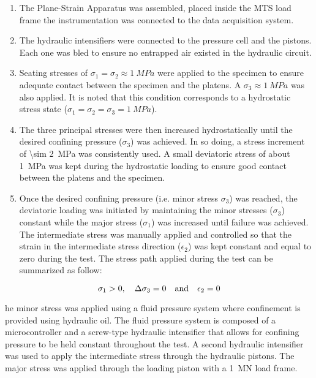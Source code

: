 \begin{enumerate}
    \item The Plane-Strain Apparatus was assembled, placed inside the MTS load frame the instrumentation was connected to the data acquisition system.
    \item The hydraulic intensifiers were connected to the pressure cell and the pistons. Each one was bled to ensure no entrapped air existed in the hydraulic circuit. 
    \item Seating stresses of $\sigma_1 = \sigma_2 \approx \SI{1}{MPa}$ were applied to the specimen to ensure adequate contact between the specimen and the platens. A $\sigma_3 \approx \SI{1}{MPa}$ was also applied. It is noted that this condition corresponds to a hydrostatic stress state ($\sigma_1 = \sigma_2 = \sigma_3 = \SI{1}{MPa}$).
    \item The three principal stresses were then increased hydrostatically until the desired confining pressure ($\sigma_3$) was achieved. In so doing, a stress increment of \SI{\sim 2}{MPa} was consistently used. A small deviatoric stress of about \SI{1}{MPa} was kept during the hydrostatic loading to ensure good contact between the platens and the specimen.
    \item Once the desired confining pressure (i.e. minor stress $\sigma_3$) was reached, the deviatoric loading was initiated by maintaining the minor stresses ($\sigma_3$) constant while the major stress ($\sigma_1$) was increased until failure was achieved. The intermediate stress was manually applied and controlled so that the strain in the intermediate stress direction ($\epsilon_2$) was kept constant and equal to zero during the test.  The stress path applied during the test can be summarized as follow:
\end{enumerate}

\begin{equation}
    \sigma_1 > 0 ,\quad \Delta\sigma_3 = 0 \quad \textmd{and} \quad \epsilon_2= 0
\end{equation}

he minor stress was applied using a fluid pressure system where confinement is provided using hydraulic oil. The fluid pressure system is composed of a microcontroller and a screw-type hydraulic intensifier that allows for confining pressure to be held constant throughout the test. A second hydraulic intensifier was used to apply the intermediate stress through the hydraulic pistons. The major stress was applied through the loading piston with a \SI{1}{\mega\newton} load frame. 

